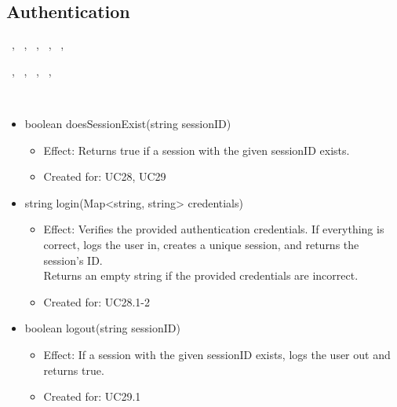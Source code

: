   \subsection{Authentication}\label{int:OnlineServiceOnlineServiceAuthenticationManagerAuthentication}
    \begin{description}
      \item[Provided by:] \iconcomponent{}~, \iconcomponent{}~, \iconcomponent{}~, \iconcomponent{}~, \iconcomponent{}~, \iconcomponent{}~
      \item[Required by:] \iconcomponent{}~, \iconcomponent{}~, \iconcomponent{}~, \iconcomponent{}~, \iconcomponent{}~
      \item[Operations:] ~
    \begin{itemize}[noitemsep,nolistsep,leftmargin=-.25cm]
      \item \textsf{boolean doesSessionExist(string sessionID)}
        \begin{itemize}[noitemsep,nolistsep]
           \item Effect: Returns true if a session with the given sessionID exists.
\item Created for: UC28, UC29
        \end{itemize}
      \item \textsf{string login(Map\textless{}string, string\textgreater{} credentials)}
        \begin{itemize}[noitemsep,nolistsep]
           \item Effect: Verifies the provided authentication credentials. If everything is correct, logs the user in, creates a unique session, and returns the session's ID. \\
Returns an empty string if the provided credentials are incorrect.
\item Created for: UC28.1-2
        \end{itemize}
      \item \textsf{boolean logout(string sessionID)}
        \begin{itemize}[noitemsep,nolistsep]
           \item Effect: If a session with the given sessionID exists, logs the user out and returns true.
\item Created for: UC29.1
        \end{itemize}
    \end{itemize}
    \end{description}

